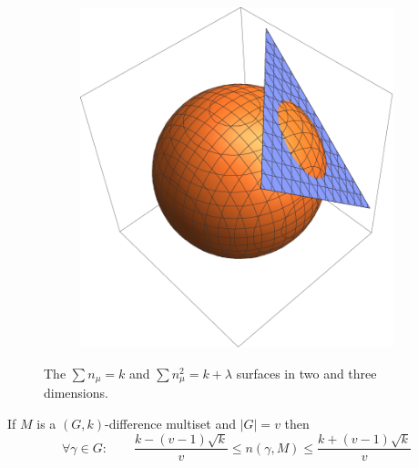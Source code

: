 \begin{figure}
\begin{subfigure}[b]{0.5\textwidth}
		\includegraphics[width=\textwidth]{assets/surfacesIn3D}
	\end{subfigure}
	\caption{The $\sum {n_\mu} = k$ and $\sum n_\mu^2 = k + \lambda$ surfaces in two and three dimensions.}
	\label{general:figure:surfaces}
\end{figure}
	
\begin{theorem}
	\label{general:theorem:limits}
	If $M$ is a $(G,k)$-difference multiset and $|G|=v$ then
	\begin{equation}
		\forall \gamma \in G \colon\qquad \frac{k-(v-1)\sqrt k}{v} \leq n(\gamma,M) \leq \frac{k+(v-1)\sqrt k}{v}
	\end{equation}
\end{theorem}

